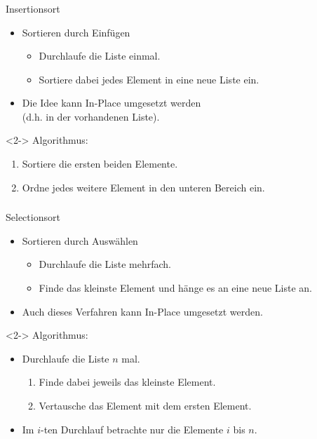 \begin{frame}
\frametitle{\insertsection}
\begin{block}
{Insertionsort}
\begin{itemize}
	\item \glqq Sortieren durch Einfügen\grqq
	\begin{itemize}
		\item Durchlaufe die Liste einmal.
		\item Sortiere dabei jedes Element in eine neue Liste ein.
	\end{itemize}
	\item Die Idee kann In-Place umgesetzt werden\\ (d.h. in der vorhandenen Liste).
\end{itemize}
\end{block}
\begin{block}<2->
{Algorithmus:}
\begin{enumerate}
	\item Sortiere die ersten beiden Elemente.
	\item Ordne jedes weitere Element in den unteren Bereich ein.
\end{enumerate}
\end{block}
\end{frame}

\begin{frame}
\frametitle{\insertsection}
\begin{block}
{Selectionsort}
\begin{itemize}
	\item \glqq Sortieren durch Auswählen\grqq
	\begin{itemize}
		\item Durchlaufe die Liste mehrfach.
		\item Finde das kleinste Element und hänge es an eine neue Liste an.
	\end{itemize}
	\item Auch dieses Verfahren kann In-Place umgesetzt werden.
\end{itemize}
\end{block}
\begin{block}<2->
{Algorithmus:}
\begin{itemize}
	\item Durchlaufe die Liste $n$ mal.
	\begin{enumerate}
		\item Finde dabei jeweils das kleinste Element.
		\item Vertausche das Element mit dem ersten Element.
	\end{enumerate}
	\item Im $i$-ten Durchlauf betrachte nur die Elemente $i$ bis $n$.
\end{itemize}
\end{block}
\end{frame}

